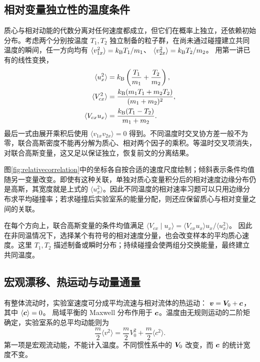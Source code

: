 \subsection{相对变量独立性的温度条件}
\label{th:relativecorrelation}
质心与相对动能的代数分离对任何速度都成立，但它们在概率上独立，还依赖初始分布。考虑两个分别按温度 $T_1,T_2$ 独立制备的粒子群，在尚未通过碰撞建立共同温度的瞬间，任一方向均有
$\langle v_{1x}^2\rangle=k_{\mathrm B} T_1/m_1$、
$\langle v_{2x}^2\rangle=k_{\mathrm B} T_2/m_2$。
用第一讲已有的线性变换，
\begin{align*}
 \langle u_x^2\rangle&=k_{\mathrm B}\left(\frac{T_1}{m_1}+\frac{T_2}{m_2}\right),\\
 \langle V_{cx}^2\rangle&=
 \frac{k_{\mathrm B}(m_1T_1+m_2T_2)}{(m_1+m_2)^2},\\
 \langle V_{cx}u_x\rangle&=
 \frac{k_{\mathrm B}(T_1-T_2)}{m_1+m_2}.
\end{align*}
最后一式由展开乘积后使用 $\langle v_{1x}v_{2x}\rangle=0$ 得到。不同温度时交叉协方差一般不为零，联合高斯密度不能再分解为质心、相对两个因子的乘积。等温时交叉项消失，对联合高斯变量，这又足以保证独立，恢复前文的分离结果。

图\ref{fig:relativecorrelation}中的坐标各自按合适的速度尺度绘制；倾斜表示条件均值随另一变量改变。即使有这种关联，单独对质心变量积分后的相对速度边缘分布仍是高斯，其宽度就是上式的 $\langle u_x^2\rangle$。因此不同温度的相对速率习题可以只用边缘分布求平均碰撞率；若求碰撞后实验室系的能量分配，则还应保留质心与相对变量之间的关联。

在每个方向上，联合高斯变量的条件均值满足
$\langle V_{cx}\mid u_x\rangle
=\langle V_{cx}u_x\rangle u_x/\langle u_x^2\rangle$。
因此在非同温情况下，选择某个有符号的相对速度分量，也会改变样本的平均质心速度。这里 $T_1,T_2$ 描述制备或瞬时分布；持续碰撞会使两组分交换能量，最终建立共同温度。

\subsection{宏观漂移、热运动与动量通量}
\label{th:pressuretensor}
有整体流动时，实验室速度可分成平均流速与相对流体的热运动：
$\bm{v}=\bm{V}_0+\bm{c}$，其中 $\langle\bm{c}\rangle=0$。
局域平衡的 Maxwell 分布作用于 $\bm{c}$。温度由无规则运动的二阶矩确定，实验室系的总平均动能则为
\[
 \frac m2\langle v^2\rangle
 =\frac m2V_0^2+\frac m2\langle c^2\rangle.
\]
第一项是宏观流动能，不能计入温度。不同惯性系中的 $\bm{V}_0$ 改变，而 $\bm{c}$ 的统计宽度不变。


